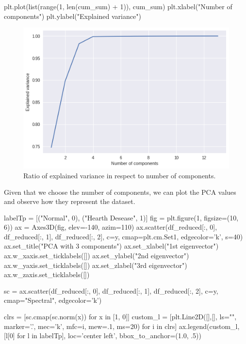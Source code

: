 \documentclass[12pt]{article}
\begin{document}
\begin{python}
    plt.plot(list(range(1, len(cum_sum) + 1)), cum_sum)
    plt.xlabel("Number of components")
    plt.ylabel("Explained variance")
\end{python}

\begin{figure}[H]
    \centering
    \includegraphics[width=\textwidth]{img/variance-components.png}
    \caption{Ratio of explained variance in respect to number of components.}
\end{figure}

Given that we choose the number of components, we can plot the PCA values and observe how they represent the dataset.

\begin{python}
    labelTp = [("Normal", 0), ("Hearth Desease", 1)]
    fig = plt.figure(1, figsize=(10, 6))
    ax = Axes3D(fig, elev=-140, azim=110)
    ax.scatter(df_reduced[:, 0], df_reduced[:, 1], df_reduced[:, 2], c=y,
            cmap=plt.cm.Set1, edgecolor='k', s=40)
    ax.set_title("PCA with 3 components")
    ax.set_xlabel("1st eigenvector")
    ax.w_xaxis.set_ticklabels([])
    ax.set_ylabel("2nd eigenvector")
    ax.w_yaxis.set_ticklabels([])
    ax.set_zlabel("3rd eigenvector")
    ax.w_zaxis.set_ticklabels([])

    sc = ax.scatter(df_reduced[:, 0], df_reduced[:, 1], df_reduced[:, 2], c=y, cmap="Spectral", edgecolor='k')

    clrs = [sc.cmap(sc.norm(x)) for x in [1, 0]]
    custom_l = [plt.Line2D([],[], ls="", marker='.', 
                    mec='k', mfc=i, mew=.1, ms=20) for i in clrs]
    ax.legend(custom_l, [l[0] for l in labelTp], 
            loc='center left', bbox_to_anchor=(1.0, .5))
\end{python}
\end{document}

